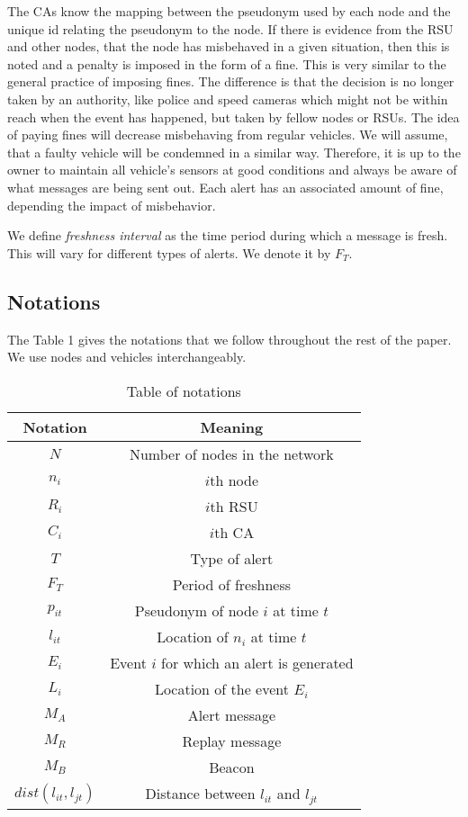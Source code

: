 \documentclass[conference]{IEEEtran}[10pt]
\begin{document}
The CAs know the mapping between the pseudonym  used by each node
and the unique id relating the pseudonym to the node.
If there is evidence from the RSU and other nodes, that the node has misbehaved in a given situation, then this is noted and
a penalty is imposed in the form of a fine. 
This is very similar to the general practice of imposing fines.
The difference is that the decision is no longer taken by an authority, like police and speed cameras which might not be within reach
 when the event has happened, but taken by fellow nodes or RSUs. 
The idea of paying fines  will decrease misbehaving from regular vehicles.
We will assume, that a faulty vehicle will be condemned in a similar way. 
 Therefore, it is up to the owner to maintain  all vehicle's sensors at good conditions and always be aware 
of what messages are being sent out. 
Each alert has an associated  amount of fine, depending the impact of misbehavior. 


We define \emph{freshness interval} as the time period during which a message is fresh.
This will vary for different types of alerts.  
We denote it by $F_T$. 
 
\subsection{Notations}
The Table 1 gives the notations that we follow throughout the rest of the paper. 
We use nodes and vehicles interchangeably. 


\begin{table}
\begin{center}
\begin{tabular}{|c|c|}
\hline
Notation & Meaning \\
\hline
$N$ & Number of nodes in the network\\
$n_i$ & $i$th node\\
$R_i$ & $i$th RSU\\
$C_i$ & $i$th CA\\
$T$ & Type of alert\\
$F_T$ & Period of freshness \\
$p_{it}$ & Pseudonym of node $i$ at time $t$\\
$l_{it}$ & Location of $n_i$ at time $t$\\
$E_i$ & Event $i$ for which an alert is generated\\
$L_i$ & Location of the event $E_i$\\
$M_A$ & Alert message\\
$M_R$ & Replay message\\
$M_B$ & Beacon\\
$dist(l_{it},l_{jt})$ & Distance between $l_{it}$ and $l_{jt}$\\
\hline
\end{tabular}
\end{center}
\label{table:notations}
\caption{Table of notations}
\end{table}
\end{document}
